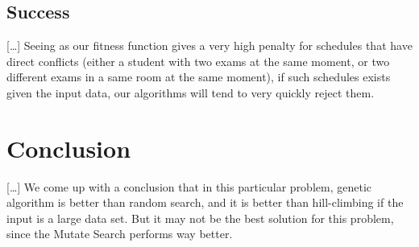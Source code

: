 \documentclass[letterpaper]{article}
\begin{document}
  \subsection{Success}
    [\ldots]
    Seeing as our fitness function gives a very high penalty for schedules that have direct
    conflicts (either a student with two exams at the same moment, or two different exams
    in a same room at the same moment), if such schedules exists given the input data, 
    our algorithms will tend to very quickly reject them. 
  
\section{Conclusion}
  [\ldots]
  We come up with a conclusion that in this particular problem, genetic algorithm
  is better than random search, and it is better than hill-climbing if the input 
  is a large data set. But it may not be the best solution for this problem, since
  the Mutate Search performs way better.
  
  \nocite{*}


\end{document}

